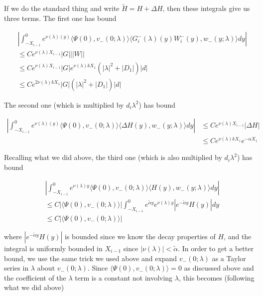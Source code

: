 \documentclass[12pt]{article}
\begin{document}
\begin{enumerate}
If we do the standard thing and write $\tilde{H} = H + \Delta H$, then these integrals give us three terms. The first one has bound

\begin{align*}
&\left| \int_{-X_{i-1}}^0
e^{\nu(\lambda)(y)} \langle \Psi(0), v_-(0; \lambda) \rangle \langle G_i^-(\lambda)(y)W_i^-(y), w_-(y; \lambda) \rangle dy \right| \\
&\leq C e^{\nu(\lambda) X_{i-1}} |G| ||W|| \\
&\leq C e^{\nu(\lambda) X_{i-1}} |G| e^{\nu(\lambda)k X_1} ( |\lambda|^2 + |D_1| )|d| \\
&\leq C e^{2 \nu(\lambda) k X_1} |G| ( |\lambda|^2 + |D_1| )|d|
\end{align*}

The second one (which is multiplied by $d_i \lambda^2$) has bound

\begin{align*}
\left| \int_{-X_{i-1}}^0
e^{\nu(\lambda)(y)} \langle \Psi(0), v_-(0; \lambda) \rangle \langle \Delta H(y), w_-(y; \lambda) \rangle dy \right| 
&\leq C e^{\nu(\lambda)X_{i-1}} |\Delta H| \\
&\leq C e^{\nu(\lambda)k X_1} e^{-\alpha X_1}
\end{align*}

Recalling what we did above, the third one (which is also multiplied by $d_i \lambda^2$) has bound

\begin{align*}
&\left| \int_{-X_{i-1}}^0 e^{\nu(\lambda)y} \langle \Psi(0), v_-(0; \lambda) \rangle
\langle H(y), w_-(y; \lambda) \rangle dy \right| \\
&\leq C |\langle \Psi(0), v_-(0; \lambda) \rangle| \int_{-X_{i-1}}^0 e^{\tilde{\alpha}y}e^{\nu(\lambda)y} | e^{-\tilde{\alpha} y} H(y)|dy\\
&\leq C |\langle \Psi(0), v_-(0; \lambda) \rangle|
\end{align*}

where $|e^{-\tilde{\alpha} y} H(y)|$ is bounded since we know the decay properties of $H$, and the integral is uniformly bounded in $X_{i-1}$ since $|\nu(\lambda)| < \tilde{\alpha}$. In order to get a better bound, we use the same trick we used above and expand $v_-(0; \lambda)$ as a Taylor series in $\lambda$ about $v_-(0; \lambda)$. Since $\langle \Psi(0), v_-(0; \lambda) \rangle = 0$ as discussed above and the coefficient of the $\lambda$ term is a constant not involving $\lambda$, this becomes (following what we did above)


\end{enumerate}
\end{document}
